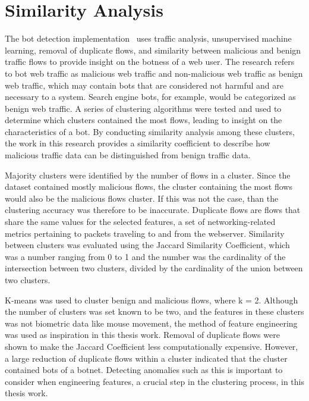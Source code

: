 
\section{Similarity Analysis}\label{sec:similarity-analysis}
The bot detection implementation~\cite{bot_detection_wei_alvarez} uses traffic analysis, unsupervised machine learning, removal of duplicate flows, and similarity between malicious and benign traffic flows to provide insight on the botness of a web user.
The research refers to bot web traffic as malicious web traffic and non-malicious web traffic as benign web traffic, which may contain bots that are considered not harmful and are necessary to a system.
Search engine bots, for example, would be categorized as benign web traffic.
A series of clustering algorithms were tested and used to determine which clusters contained the most flows, leading to insight on the characteristics of a bot.
By conducting similarity analysis among these clusters, the work in this research provides a similarity coefficient to describe how malicious traffic data can be distinguished from benign traffic data.

Majority clusters were identified by the number of flows in a cluster.
Since the dataset contained mostly malicious flows, the cluster containing the most flows would also be the malicious flows cluster.
If this was not the case, than the clustering accuracy was therefore to be inaccurate.
Duplicate flows are flows that share the same values for the selected features, a set of networking-related metrics pertaining to packets traveling to and from the webserver.
Similarity between clusters was evaluated using the Jaccard Similarity Coefficient, which was a number ranging from 0 to 1 and the number was the cardinality of the intersection between two clusters, divided by the cardinality of the union between two clusters.

K-means was used to cluster benign and malicious flows, where k = 2.
Although the number of clusters was set known to be two, and the features in these clusters was not biometric data like mouse movement, the method of feature engineering was used as inspiration in this thesis work.
Removal of duplicate flows were shown to make the Jaccard Coefficient less computationally expensive.
However, a large reduction of duplicate flows within a cluster indicated that the cluster contained bots of a botnet.
Detecting anomalies such as this is important to consider when engineering features, a crucial step in the clustering process, in this thesis work.
